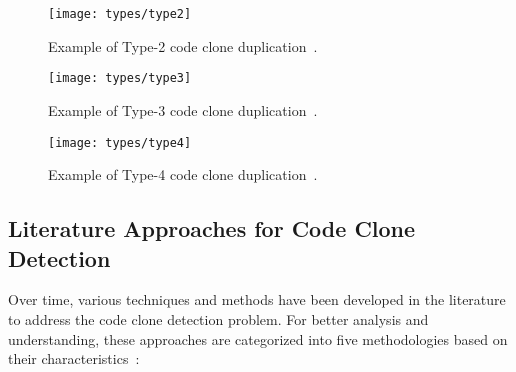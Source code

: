 \begin{figure}[ht]
\texttt{[image: types/type2]}
\caption{Example of Type-2 code clone duplication~\citep{litreview}.}
\label{fig:type2}
\end{figure}

\begin{figure}[ht]
\texttt{[image: types/type3]}
\caption{Example of Type-3 code clone duplication~\citep{litreview}.}
\label{fig:type3}
\end{figure}

\begin{figure}[ht]
\texttt{[image: types/type4]}
\caption{Example of Type-4 code clone duplication~\citep{litreview}.}
\label{fig:type4}
\end{figure}


\subsection{Literature Approaches for Code Clone Detection}

Over time, various techniques and methods have been developed in the literature
to address the code clone detection problem. For better analysis and
understanding, these approaches are categorized into five methodologies based
on their characteristics~\citep{litreview}:

